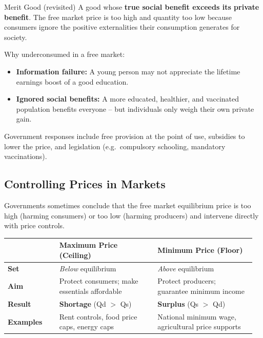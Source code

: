 \documentclass[11pt, a4paper, twoside]{book}
\begin{document}
\begin{keyterm}{Merit Good (revisited)}
A good whose \textbf{true social benefit exceeds its private benefit}. The free market price is too high and quantity too low because consumers ignore the positive externalities their consumption generates for society.
\end{keyterm}

Why underconsumed in a free market:
\begin{itemize}
  \item \textbf{Information failure:} A young person may not appreciate the lifetime earnings boost of a good education.
  \item \textbf{Ignored social benefits:} A more educated, healthier, and vaccinated population benefits everyone -- but individuals only weigh their own private gain.
\end{itemize}

Government responses include free provision at the point of use, subsidies to lower the price, and legislation (e.g.\ compulsory schooling, mandatory vaccinations).

\subsection{Controlling Prices in Markets}

Governments sometimes conclude that the free market equilibrium price is too high (harming consumers) or too low (harming producers) and intervene directly with price controls.

\begin{tcolorbox}[enhanced,colback=LightBlue,colframe=MidBlue!70,arc=0pt,boxrule=0.8pt]
\begin{tabular}{@{}>{\RaggedRight\arraybackslash}p{0.20\linewidth}>{\RaggedRight\arraybackslash}p{0.38\linewidth}>{\RaggedRight\arraybackslash}p{0.38\linewidth}@{}}
& \textbf{\color{NavyPrimary}Maximum Price (Ceiling)} & \textbf{\color{NavyPrimary}Minimum Price (Floor)} \\
\midrule
\textbf{Set} & \emph{Below} equilibrium & \emph{Above} equilibrium \\
\textbf{Aim} & Protect consumers; make essentials affordable & Protect producers; guarantee minimum income \\
\textbf{Result} & \textbf{Shortage} (Qd $>$ Qs) & \textbf{Surplus} (Qs $>$ Qd) \\
\textbf{Examples} & Rent controls, food price caps, energy caps & National minimum wage, agricultural price supports \\
\end{tabular}
\end{tcolorbox}
\end{document}

